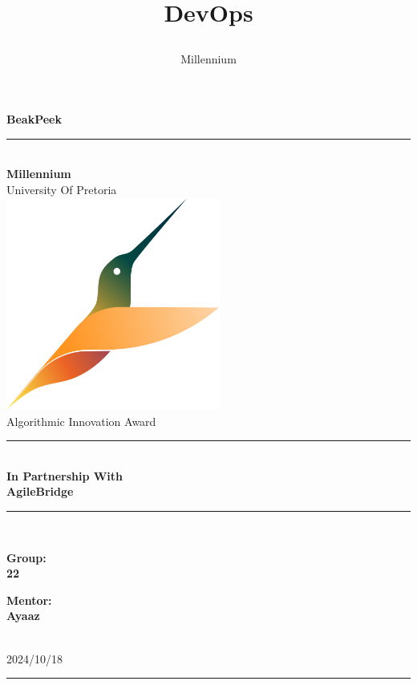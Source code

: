 \documentclass[a4paper]{article}
\title{

\\
{DevOps}
}
\author{Millennium}
\begin{document}
\begin{titlepage}

\begin{center}

{\Huge \bf BeakPeek}\\[10pt]
\rule{\textwidth}{1pt}\\[20pt]
{\bf \huge \sc Millennium} \\[10pt]
{\huge University Of Pretoria} \\[15pt]
\includegraphics[width=7cm]{../Assets/BeakPeekLogoNoBackground.png}\\[15pt]
{\huge Algorithmic Innovation Award}\\[60pt]
\rule{8cm}{1pt}\\[5pt]
{\bf \huge \sc In Partnership With}\\[15pt]
{\huge \bf AgileBridge}\\[5pt]
\rule{8cm}{1pt}\\[50pt]

\begin{minipage}[t]{10cm}
	{\Large{\bf Group:\\ 22}}
\end{minipage}\hfill\begin{minipage}[t]{5cm}\raggedleft
	{\Large{\bf Mentor: \\Ayaaz\\ }}
\end{minipage} \\[90pt]
{\Large 2024/10/18} \\ [5pt]

\rule{\textwidth}{1pt}\\[10pt]

\end{center}

\vfill

\end{titlepage}
\end{document}
